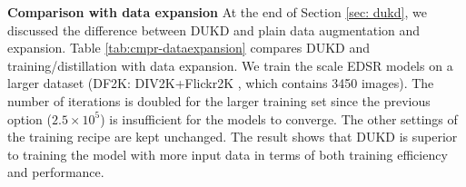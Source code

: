 \documentclass[10pt,twocolumn,letterpaper]{article}
\begin{document}
 
\vspace{0.75em}
\noindent\textbf{Comparison with data expansion} 
At the end of Section \ref{sec: dukd}, we discussed the difference between DUKD and plain data augmentation and expansion. Table \ref{tab:cmpr-dataexpansion} compares DUKD and training/distillation with data expansion. 
We train the  scale EDSR models on a larger dataset (DF2K: DIV2K+Flickr2K \cite{timofte2017ntire}, which contains 3450 images). 
The number of iterations is doubled for the larger training set since the previous option ($2.5\times10^5$) is insufficient for the models to converge.
The other settings of the training recipe are kept unchanged.
The result shows that DUKD is superior to training the model with more input data in terms of both training efficiency and performance.

\begin{figure*}[h]
\end{figure*}
\end{document}
